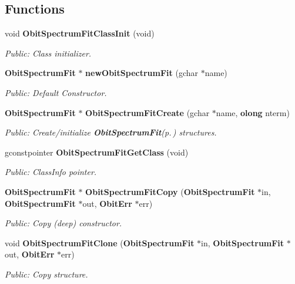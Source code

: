 \subsection*{Functions}
\begin{CompactItemize}
\item 
void {\bf Obit\-Spectrum\-Fit\-Class\-Init} (void)
\begin{CompactList}\small\item\em Public: Class initializer. \item\end{CompactList}\item 
{\bf Obit\-Spectrum\-Fit} $\ast$ {\bf new\-Obit\-Spectrum\-Fit} (gchar $\ast$name)
\begin{CompactList}\small\item\em Public: Default Constructor. \item\end{CompactList}\item 
{\bf Obit\-Spectrum\-Fit} $\ast$ {\bf Obit\-Spectrum\-Fit\-Create} (gchar $\ast$name, {\bf olong} nterm)
\begin{CompactList}\small\item\em Public: Create/initialize {\bf Obit\-Spectrum\-Fit}{\rm (p.\,\pageref{structObitSpectrumFit})} structures. \item\end{CompactList}\item 
gconstpointer {\bf Obit\-Spectrum\-Fit\-Get\-Class} (void)
\begin{CompactList}\small\item\em Public: Class\-Info pointer. \item\end{CompactList}\item 
{\bf Obit\-Spectrum\-Fit} $\ast$ {\bf Obit\-Spectrum\-Fit\-Copy} ({\bf Obit\-Spectrum\-Fit} $\ast$in, {\bf Obit\-Spectrum\-Fit} $\ast$out, {\bf Obit\-Err} $\ast$err)
\begin{CompactList}\small\item\em Public: Copy (deep) constructor. \item\end{CompactList}\item 
void {\bf Obit\-Spectrum\-Fit\-Clone} ({\bf Obit\-Spectrum\-Fit} $\ast$in, {\bf Obit\-Spectrum\-Fit} $\ast$out, {\bf Obit\-Err} $\ast$err)
\begin{CompactList}\small\item\em Public: Copy structure. \item\end{CompactList}\item 

\end{CompactItemize}
